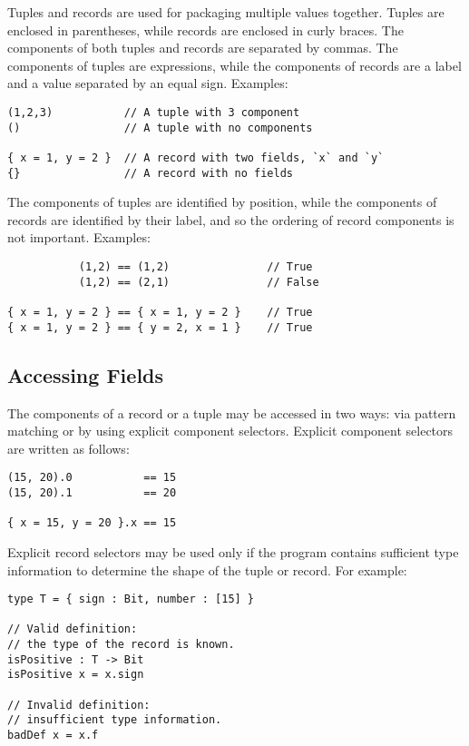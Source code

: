 Tuples and records are used for packaging multiple values together.
Tuples are enclosed in parentheses, while records are enclosed in curly
braces. The components of both tuples and records are separated by
commas. The components of tuples are expressions, while the components
of records are a label and a value separated by an equal sign. Examples:

\begin{verbatim}
(1,2,3)           // A tuple with 3 component
()                // A tuple with no components

{ x = 1, y = 2 }  // A record with two fields, `x` and `y`
{}                // A record with no fields
\end{verbatim}

The components of tuples are identified by position, while the
components of records are identified by their label, and so the ordering
of record components is not important. Examples:

\begin{verbatim}
           (1,2) == (1,2)               // True
           (1,2) == (2,1)               // False

{ x = 1, y = 2 } == { x = 1, y = 2 }    // True
{ x = 1, y = 2 } == { y = 2, x = 1 }    // True
\end{verbatim}

\hypertarget{accessing-fields}{%
\subsection{Accessing Fields}\label{accessing-fields}}

The components of a record or a tuple may be accessed in two ways: via
pattern matching or by using explicit component selectors. Explicit
component selectors are written as follows:

\begin{verbatim}
(15, 20).0           == 15
(15, 20).1           == 20

{ x = 15, y = 20 }.x == 15
\end{verbatim}

Explicit record selectors may be used only if the program contains
sufficient type information to determine the shape of the tuple or
record. For example:

\begin{verbatim}
type T = { sign : Bit, number : [15] }

// Valid definition:
// the type of the record is known.
isPositive : T -> Bit
isPositive x = x.sign

// Invalid definition:
// insufficient type information.
badDef x = x.f
\end{verbatim}

